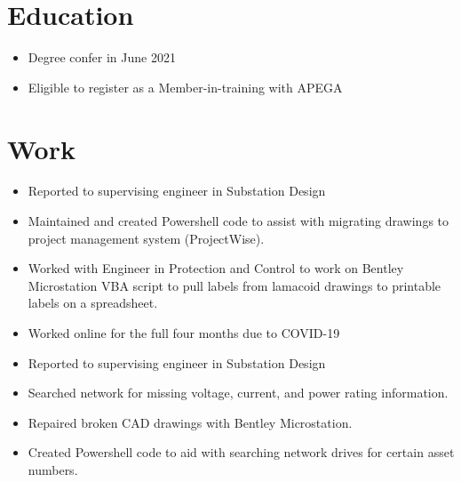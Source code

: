 \documentclass{lsanche_cv}
\begin{document}

\medskip


\smallskip


\begin{multicols*}{2}
  \section{Education}
    \begin{itemize}
      \item Degree confer in June 2021
      \item Eligible to register as a Member-in-training with APEGA
    \end{itemize}

  \section{Work}
    \begin{itemize}
      \item Reported to supervising engineer in Substation Design
      \item Maintained and created Powershell code to assist with migrating drawings to project management system (ProjectWise).
      \item Worked with Engineer in Protection and Control to work on Bentley Microstation VBA script to pull labels from lamacoid drawings to printable labels on a spreadsheet.
      \item Worked online for the full four months due to COVID-19
    \end{itemize}

    \divider

    \begin{itemize}
      \item Reported to supervising engineer in Substation Design
      \item Searched network for missing voltage, current, and power rating information.
      \item Repaired broken CAD drawings with Bentley Microstation.
      \item Created Powershell code to aid with searching network drives for certain asset numbers.
    \end{itemize}


\end{multicols*}
\end{document}
